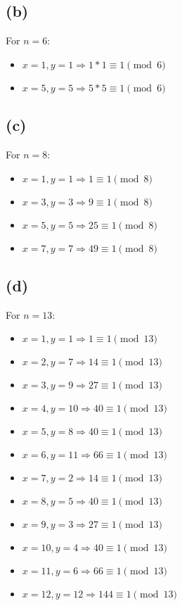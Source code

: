 \documentclass[12pt]{article}
\begin{document}
\subsection*{(b)}
For $n=6$:
\begin{itemize}
    \item $x=1,y=1\Rightarrow1*1\equiv 1\pmod6$
    \item $x=5,y=5\Rightarrow5*5\equiv 1\pmod6$
\end{itemize}
\subsection*{(c)}
For $n=8$:
\begin{itemize}
    \item $x=1,y=1\Rightarrow1\equiv 1\pmod8$
    \item $x=3,y=3\Rightarrow9\equiv 1\pmod8$
    \item $x=5,y=5\Rightarrow25\equiv 1\pmod8$
    \item $x=7,y=7\Rightarrow49\equiv 1\pmod8$
\end{itemize}
\subsection*{(d)}
For $n=13$:
\begin{itemize}
    \item $x=1,y=1\Rightarrow1\equiv 1\pmod{13}$
    \item $x=2,y=7\Rightarrow14\equiv 1\pmod{13}$ 
    \item $x=3,y=9\Rightarrow27\equiv 1\pmod{13}$
    \item $x=4,y=10\Rightarrow40\equiv 1\pmod{13}$
    \item $x=5,y=8\Rightarrow40\equiv 1\pmod{13}$
    \item $x=6,y=11\Rightarrow66\equiv 1\pmod{13}$
    \item $x=7,y=2\Rightarrow14\equiv 1\pmod{13}$
    \item $x=8,y=5\Rightarrow40\equiv 1\pmod{13}$
    \item $x=9,y=3\Rightarrow27\equiv 1\pmod{13}$
    \item $x=10,y=4\Rightarrow40\equiv 1\pmod{13}$
    \item $x=11,y=6\Rightarrow66\equiv 1\pmod{13}$
    \item $x=12,y=12\Rightarrow144\equiv 1\pmod{13}$
\end{itemize}
\end{document}

